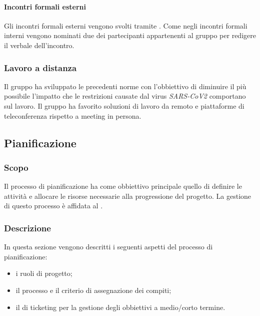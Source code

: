 \paragraph{Incontri formali esterni}
Gli incontri formali esterni vengono svolti tramite . Come negli incontri formali interni vengono nominati due dei partecipanti appartenenti al gruppo per redigere il verbale dell'incontro. 

\subsubsection{Lavoro a distanza}
Il gruppo ha sviluppato le precedenti norme con l'obbiettivo di diminuire il più possibile l'impatto che le restrizioni causate dal virus \textit{SARS-CoV2} comportano sul lavoro. Il gruppo ha favorito soluzioni di lavoro da remoto e piattaforme di teleconferenza rispetto a meeting in persona.

\subsection{Pianificazione}
\subsubsection{Scopo}
Il processo di pianificazione ha come obbiettivo principale quello di definire le attività e allocare le risorse necessarie alla progressione del progetto. La gestione di questo processo è affidata al \RdP{}.
\subsubsection{Descrizione}
In questa sezione vengono descritti i seguenti aspetti del processo di pianificazione:
\begin{itemize}
\item i ruoli di progetto;
\item il processo e il criterio di assegnazione dei compiti;
\item il  di ticketing per la gestione degli obbiettivi a medio/corto termine.
\end{itemize} 
